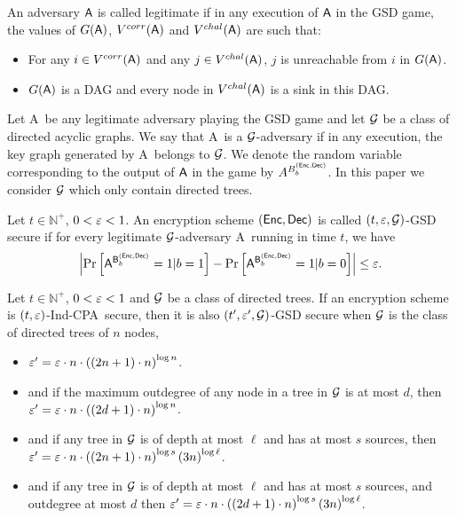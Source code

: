 \documentclass{article}
\newcommand{\tcpa}{$(t,\eps)$-Ind-CPA}
\def\B{{\sf B}}
\def\A{{\sf A}}
\newcommand{\NN}{{\mathbb{N}}}
\begin{document}
\begin{definition} An adversary $\A$ is called legitimate if in any execution of $\A$ in the GSD game,
the values of $G(\A)$, $V^{corr}(\A)$ and $V^{chal}(\A)$ are such that:
\begin{itemize}
\item For any $i \in V^{corr}(\A)$ and any $j \in V^{chal}(\A)$, $j$ is unreachable from $i$ in $G(\A)$.
\item $G(\A)$ is a DAG and every node in $V^{chal}(\A)$ is a sink in this DAG.
\end{itemize}
\end{definition}

Let \A~be any legitimate adversary playing the GSD game and let ${\cal G}$ be a class of directed acyclic graphs. We say that \A~is a ${\cal G}$-adversary if in any execution, the key graph generated by \A~belongs to ${\cal G}$. We denote the random variable corresponding to the output
of $\A$ in the game by $A^{B^{({\sf Enc},{\sf Dec})}_b}$. In this paper we consider ${\cal G}$ which only contain directed trees.  

\begin{definition} Let $t \in \NN^+$, $0 < \varepsilon < 1$. An encryption scheme $({\sf Enc},{\sf Dec})$ is called $(t,\varepsilon, {\cal G})$-GSD secure if for every legitimate ${\cal G}$-adversary \A~running in time $t$, we have
$$\abs{\prob{\A^{\B^{(\Enc,\Dec)}_b}=1|b=1}-\prob{\A^{\B^{(\Enc,\Dec)}_b}=1|b=0}}\leq \eps.$$
\end{definition}

\begin{theorem}\label{thm:main}
Let $t \in \NN^+$, $0 < \varepsilon < 1$ and ${\cal G}$ be a class of directed trees. If an encryption scheme is \tcpa~secure, then it is also $(t',\varepsilon',{\cal G})$-GSD secure when ${\cal G}$ is the class of directed trees of $n$ nodes,

\begin{itemize}
\item$\varepsilon'=\varepsilon \cdot n \cdot \left( (2n+1)\cdot n \right)^{\log n}$.
\item and if the maximum outdegree of any node in a tree in ${\cal G}$ is at most $d$, then $\varepsilon'=\varepsilon \cdot n \cdot \left( (2d+1)\cdot n \right)^{\log n}$.
\item and if any tree in ${\cal G}$ is of depth at most $\ell$ and has at most $s$ sources, then $\varepsilon'=\varepsilon \cdot n \cdot \left( (2n+1)\cdot n \right)^{\log s} \left( 3n \right)^{\log \ell} $.
\item and if any tree in ${\cal G}$ is of depth at most $\ell$ and has at most $s$ sources, and outdegree at most $d$ then $\varepsilon'=\varepsilon \cdot n \cdot \left( (2d+1)\cdot n \right)^{\log s} \left( 3n \right)^{\log \ell} $.

\end{itemize} 
\end{theorem}
\end{document}
